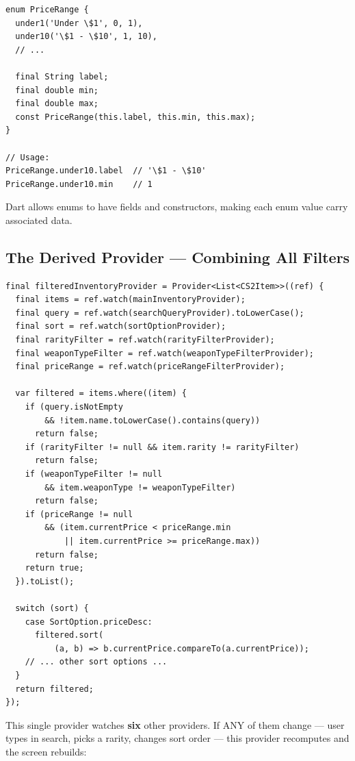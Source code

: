 \documentclass[11pt, a4paper]{article}
\begin{document}
\begin{conceptbox}[title=\textbf{Enhanced Enums --- Enums with Fields}]
\begin{lstlisting}[numbers=none]
enum PriceRange {
  under1('Under \$1', 0, 1),
  under10('\$1 - \$10', 1, 10),
  // ...

  final String label;
  final double min;
  final double max;
  const PriceRange(this.label, this.min, this.max);
}

// Usage:
PriceRange.under10.label  // '\$1 - \$10'
PriceRange.under10.min    // 1
\end{lstlisting}

Dart allows enums to have fields and constructors, making each enum value carry associated data.
\end{conceptbox}

\subsection{The Derived Provider --- Combining All Filters}

\begin{lstlisting}
final filteredInventoryProvider = Provider<List<CS2Item>>((ref) {
  final items = ref.watch(mainInventoryProvider);
  final query = ref.watch(searchQueryProvider).toLowerCase();
  final sort = ref.watch(sortOptionProvider);
  final rarityFilter = ref.watch(rarityFilterProvider);
  final weaponTypeFilter = ref.watch(weaponTypeFilterProvider);
  final priceRange = ref.watch(priceRangeFilterProvider);

  var filtered = items.where((item) {
    if (query.isNotEmpty
        && !item.name.toLowerCase().contains(query))
      return false;
    if (rarityFilter != null && item.rarity != rarityFilter)
      return false;
    if (weaponTypeFilter != null
        && item.weaponType != weaponTypeFilter)
      return false;
    if (priceRange != null
        && (item.currentPrice < priceRange.min
            || item.currentPrice >= priceRange.max))
      return false;
    return true;
  }).toList();

  switch (sort) {
    case SortOption.priceDesc:
      filtered.sort(
          (a, b) => b.currentPrice.compareTo(a.currentPrice));
    // ... other sort options ...
  }
  return filtered;
});
\end{lstlisting}

This single provider watches \textbf{six} other providers. If ANY of them change --- user types in search, picks a rarity, changes sort order --- this provider recomputes and the screen rebuilds:
\end{document}
